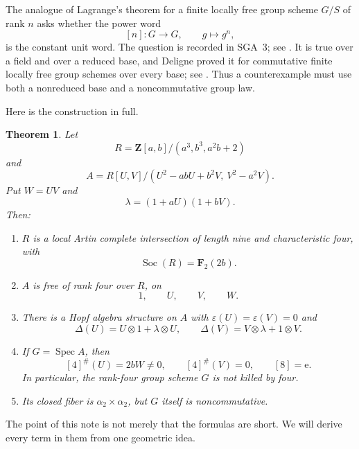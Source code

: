 \documentclass[11pt]{amsart}
\newtheorem{theorem}{Theorem}[section]
\theoremstyle{definition}
\theoremstyle{remark}
\newcommand{\Z}{\mathbf Z}
\newcommand{\F}{\mathbf F}
\newcommand{\Spec}{\operatorname{Spec}}
\newcommand{\Soc}{\operatorname{Soc}}
\newcommand{\eps}{\varepsilon}
\newcommand{\ot}{\otimes}
\newcommand{\unit}{\mathrm e}
\begin{document}
The analogue of Lagrange's theorem for a finite locally free group scheme
\(G/S\) of rank \(n\) asks whether the power word
\[
 [n]\colon G\longrightarrow G,\qquad g\longmapsto g^n,
\]
is the constant unit word.  The question is recorded in SGA~3; see
\cite[Exp.~VIII, Rem.~7.3.1]{SGA3II}.  It is true over a field and over a
reduced base, and Deligne proved it for commutative finite locally free
group schemes over every base; see \cite[\S1]{OortTate}.  Thus a
counterexample must use both a nonreduced base and a noncommutative group
law.

Here is the construction in full.

\begin{theorem}\label{thm:main}
Let
\begin{equation}\label{eq:R}
 R=\Z[a,b]/(a^3,b^3,a^2b+2)
\end{equation}
and
\begin{equation}\label{eq:A}
 A=R[U,V]/(U^2-abU+b^2V,\ V^2-a^2V).
\end{equation}
Put \(W=UV\) and
\begin{equation}\label{eq:lambda}
 \lambda=(1+aU)(1+bV).
\end{equation}
Then:
\begin{enumerate}
\item \(R\) is a local Artin complete intersection of length nine and
characteristic four, with
\[
 \Soc(R)=\F_2(2b).
\]
\item \(A\) is free of rank four over \(R\), on
\[
 1,\qquad U,\qquad V,\qquad W.
\]
\item There is a Hopf algebra structure on \(A\) with
\(\eps(U)=\eps(V)=0\) and
\begin{equation}\label{eq:Delta}
 \Delta(U)=U\ot1+\lambda\ot U,\qquad
 \Delta(V)=V\ot\lambda+1\ot V.
\end{equation}
\item If \(G=\Spec A\), then
\begin{equation}\label{eq:powers}
 [4]^\#(U)=2bW\ne0,\qquad
 [4]^\#(V)=0,\qquad
 [8]=\unit.
\end{equation}
In particular, the rank-four group scheme \(G\) is not killed by four.
\item Its closed fiber is \(\alpha _2\times\alpha _2\), but \(G\) itself
is noncommutative.
\end{enumerate}
\end{theorem}

The point of this note is not merely that the formulas are short.  We will
derive every term in them from one geometric idea.
\end{document}
